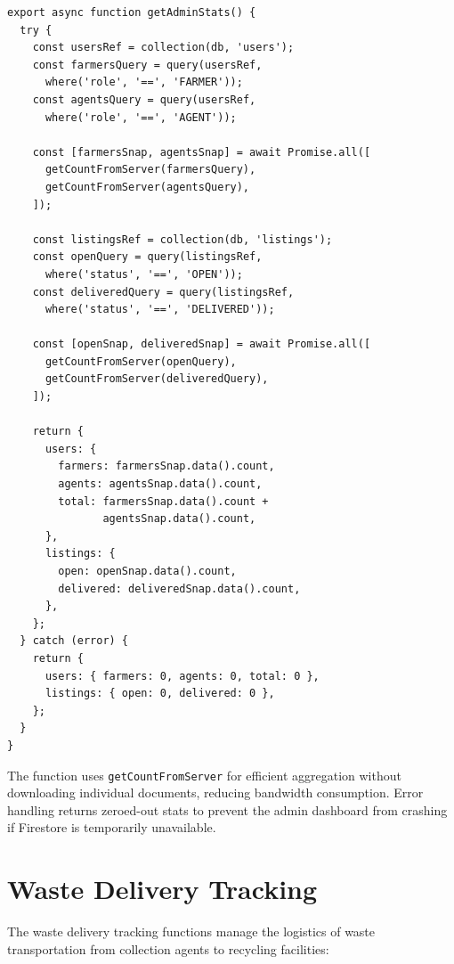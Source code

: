 \documentclass[a4paper,12pt,oneside]{report}
\begin{document}
\begin{lstlisting}[caption={Admin Stats (firebase-service.ts -- getAdminStats)}, label={lst:adminstats}]
export async function getAdminStats() {
  try {
    const usersRef = collection(db, 'users');
    const farmersQuery = query(usersRef,
      where('role', '==', 'FARMER'));
    const agentsQuery = query(usersRef,
      where('role', '==', 'AGENT'));

    const [farmersSnap, agentsSnap] = await Promise.all([
      getCountFromServer(farmersQuery),
      getCountFromServer(agentsQuery),
    ]);

    const listingsRef = collection(db, 'listings');
    const openQuery = query(listingsRef,
      where('status', '==', 'OPEN'));
    const deliveredQuery = query(listingsRef,
      where('status', '==', 'DELIVERED'));

    const [openSnap, deliveredSnap] = await Promise.all([
      getCountFromServer(openQuery),
      getCountFromServer(deliveredQuery),
    ]);

    return {
      users: {
        farmers: farmersSnap.data().count,
        agents: agentsSnap.data().count,
        total: farmersSnap.data().count +
               agentsSnap.data().count,
      },
      listings: {
        open: openSnap.data().count,
        delivered: deliveredSnap.data().count,
      },
    };
  } catch (error) {
    return {
      users: { farmers: 0, agents: 0, total: 0 },
      listings: { open: 0, delivered: 0 },
    };
  }
}
\end{lstlisting}

\noindent The function uses \texttt{getCountFromServer} for efficient aggregation without downloading individual documents, reducing bandwidth consumption. Error handling returns zeroed-out stats to prevent the admin dashboard from crashing if Firestore is temporarily unavailable.

\section{Waste Delivery Tracking}

\noindent The waste delivery tracking functions manage the logistics of waste transportation from collection agents to recycling facilities:
\end{document}
